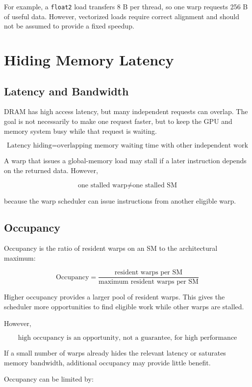 \documentclass[11pt]{article}
\begin{document}
For example, a \texttt{float2} load transfers 8 B per thread, so one warp requests 256 B of useful data. However, vectorized loads require correct alignment and should not be assumed to provide a fixed speedup.

\section{Hiding Memory Latency}

\subsection{Latency and Bandwidth}

DRAM has high access latency, but many independent requests can overlap. The goal is not necessarily to make one request faster, but to keep the GPU and memory system busy while that request is waiting.

\[
\boxed{
\text{Latency hiding}
=
\text{overlapping memory waiting time with other independent work}
}
\]

A warp that issues a global-memory load may stall if a later instruction depends on the returned data. However,

\[
\boxed{
\text{one stalled warp} \neq \text{one stalled SM}
}
\]

because the warp scheduler can issue instructions from another eligible warp.

\subsection{Occupancy}

Occupancy is the ratio of resident warps on an SM to the architectural maximum:

\[
\boxed{
\text{Occupancy}
=
\frac{\text{resident warps per SM}}
{\text{maximum resident warps per SM}}
}
\]

Higher occupancy provides a larger pool of resident warps. This gives the scheduler more opportunities to find eligible work while other warps are stalled.

However,

\[
\boxed{
\text{high occupancy is an opportunity, not a guarantee, for high performance}
}
\]

If a small number of warps already hides the relevant latency or saturates memory bandwidth, additional occupancy may provide little benefit.

Occupancy can be limited by:
\end{document}

